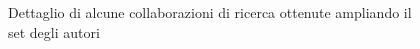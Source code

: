 \documentclass[12pt,a4paper,twoside]{report}
\begin{document}
\begin{figure}[ht]
    \vspace*{-3cm}
    \centering
    \setlength{\fboxrule}{0pt} %
    \caption{Dettaglio di alcune collaborazioni di ricerca ottenute ampliando il set degli autori}
    \label{img:grupporicerca}
\end{figure}
\end{document}
